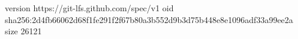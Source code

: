 version https://git-lfs.github.com/spec/v1
oid sha256:2d4fb66062d68f1fe291f2f67b80a3b552d9b3d75b448e8e1096adf33a99ee2a
size 26121
